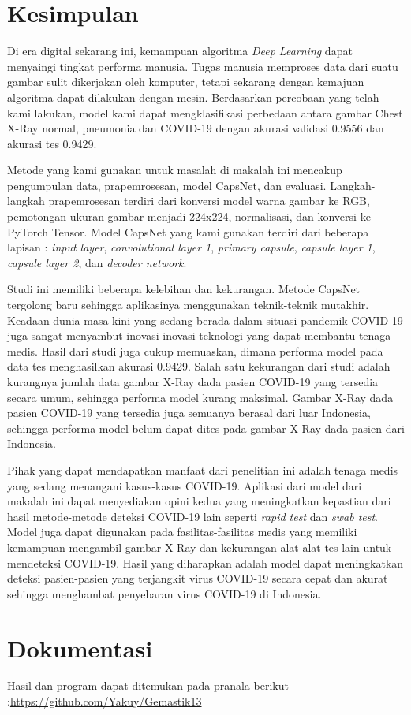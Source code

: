 \documentclass{article}
\begin{document}
   \section{Kesimpulan}
    Di era digital sekarang ini, kemampuan algoritma \textit{Deep Learning} dapat menyaingi tingkat performa manusia. Tugas manusia memproses data dari suatu gambar sulit dikerjakan oleh komputer, tetapi sekarang dengan kemajuan algoritma dapat dilakukan dengan mesin. Berdasarkan percobaan yang telah kami lakukan, model kami dapat mengklasifikasi perbedaan antara gambar Chest X-Ray normal, pneumonia dan COVID-19 dengan akurasi validasi 0.9556 dan akurasi tes 0.9429.
    \par
    Metode yang kami gunakan untuk masalah di makalah ini mencakup pengumpulan data, prapemrosesan, model CapsNet, dan evaluasi. Langkah-langkah prapemrosesan terdiri dari konversi model warna gambar ke RGB, pemotongan ukuran gambar menjadi 224x224, normalisasi, dan konversi ke PyTorch Tensor. Model CapsNet yang kami gunakan  terdiri dari beberapa lapisan : \textit{input layer}, \textit{convolutional layer 1}, \textit{primary capsule}, \textit{capsule layer 1}, \textit{capsule layer 2}, dan \textit{decoder network}.
    \par
    Studi ini memiliki beberapa kelebihan dan kekurangan. Metode CapsNet tergolong baru sehingga aplikasinya menggunakan teknik-teknik mutakhir. Keadaan dunia masa kini yang sedang berada dalam situasi pandemik COVID-19 juga sangat menyambut inovasi-inovasi teknologi yang dapat membantu tenaga medis. Hasil dari studi juga cukup memuaskan, dimana performa model pada data tes menghasilkan akurasi 0.9429. Salah satu kekurangan dari studi adalah kurangnya jumlah data gambar X-Ray dada pasien COVID-19 yang tersedia secara umum, sehingga performa model kurang maksimal. Gambar X-Ray dada pasien COVID-19 yang tersedia juga semuanya berasal dari luar Indonesia, sehingga performa model belum dapat dites pada gambar X-Ray dada pasien dari Indonesia. 
    \par
    Pihak yang dapat mendapatkan manfaat dari penelitian ini adalah tenaga medis yang sedang menangani kasus-kasus COVID-19. Aplikasi dari model dari makalah ini dapat menyediakan opini kedua yang meningkatkan kepastian dari hasil metode-metode deteksi COVID-19 lain seperti \textit{rapid test} dan \textit{swab test}. Model juga dapat digunakan pada fasilitas-fasilitas medis yang memiliki kemampuan mengambil gambar X-Ray dan kekurangan alat-alat tes lain untuk mendeteksi COVID-19. Hasil yang diharapkan adalah model dapat meningkatkan deteksi pasien-pasien yang terjangkit virus COVID-19 secara cepat dan akurat sehingga menghambat penyebaran virus COVID-19 di Indonesia.  
   
   \section{Dokumentasi}
   Hasil dan program dapat ditemukan pada pranala berikut :\url{https://github.com/Yakuy/Gemastik13}
   \newpage
   \printbibliography[title=Daftar Pustaka]
\end{document}

